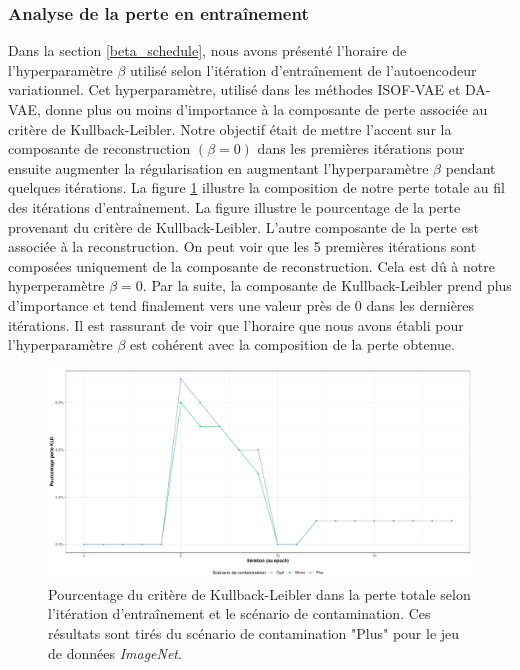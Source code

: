 \subsubsection{Analyse de la perte en entraînement}

Dans la section \ref{beta_schedule}, nous avons présenté l'horaire de l'hyperparamètre $\beta$ utilisé selon l'itération d'entraînement de l'autoencodeur variationnel. Cet hyperparamètre, utilisé dans les méthodes ISOF-VAE et DA-VAE, donne plus ou moins d'importance à la composante de perte associée au critère de Kullback-Leibler. Notre objectif était de mettre l'accent sur la composante de reconstruction $(\beta = 0)$ dans les premières itérations pour ensuite augmenter la régularisation en augmentant l'hyperparamètre $\beta$ pendant quelques itérations. La figure \ref{fig:cars_kld_perc} illustre la composition de notre perte totale au fil des itérations d'entraînement. La figure illustre le pourcentage de la perte provenant du critère de Kullback-Leibler. L'autre composante de la perte est associée à la reconstruction. On peut voir que les 5 premières itérations sont composées uniquement de la composante de reconstruction. Cela est dû à notre hyperperamètre $\beta=0$. Par la suite, la composante de Kullback-Leibler prend plus d'importance et tend finalement vers une valeur près de 0 dans les dernières itérations. Il est rassurant de voir que l'horaire que nous avons établi pour l'hyperparamètre $\beta$ est cohérent avec la composition de la perte obtenue.

\begin{figure}[H]
	\centering
	\includegraphics[width=\linewidth]{images/kld_cars.pdf}
	\caption{Pourcentage du critère de Kullback-Leibler dans la perte totale selon l'itération d'entraînement et le scénario de contamination. Ces résultats sont tirés du scénario de contamination "Plus" pour le jeu de données \textit{ImageNet}.}
	\label{fig:cars_kld_perc}
\end{figure}


